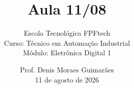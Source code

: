 
\title{Aula 11/08}

\subtitle{
\vspace{1.0cm}
Escola Tecnológica FPFtech\\
\vspace{0.5cm}
Curso: Técnico em Automação Industrial\\
\vspace{0.5cm}
Módulo: Eletrônica Digital 1
\vspace{1.0cm}
}

\author{
Prof. Denis Moraes Guimarães\\
\small 11 de agosto de 2026
}

\date{}